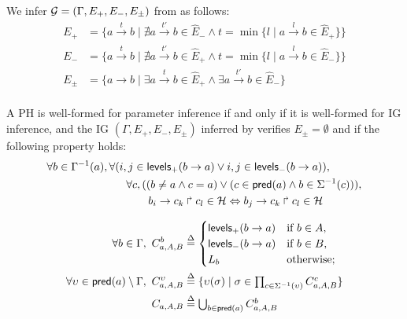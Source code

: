 \begin{proposition}\label{pps:inference-IG}
We infer $\mathcal{G} = (\Gamma,E_+,E_-,E_\pm)$ from  as follows:
\begin{align*}
E_+ &= \{a \xrightarrow{t} b \mid \nexists a \xrightarrow{t'} b \in \hat{E}_-
  \wedge t = \min \{ l \mid a \xrightarrow{l} b \in \hat{E}_+\}\} \\
E_- &= \{a \xrightarrow{t} b \mid \nexists a \xrightarrow{t'} b \in \hat{E}_+
  \wedge t = \min \{l \mid a \xrightarrow{l} b \in \hat{E}_-\}\} \\
E_\pm &= \{a \rightarrow b \mid \exists a \xrightarrow{t} b \in \hat{E}_+ \wedge \exists a \xrightarrow{t'} b \in \hat{E}_-\} \\
\end{align*}
\end{proposition}





\begin{property}\label{pro:wf-ph-K}
A PH is well-formed for parameter inference if and only if
it is well-formed for IG inference, and
the IG $(\Gamma, E_+, E_-, E_\pm)$ inferred by 
verifies $E_\pm=\emptyset$ and if the following property holds:
\begin{align}
\begin{split}
\forall b\in \Gamma^{-1}(a) &,
        \forall (i,j\in\mathsf{levels}_+(b\rightarrow a) \vee i,j\in\mathsf{levels}_-(b\rightarrow a)), \\
& \qquad        \forall c, ( (b\neq a\wedge c=a) \vee (c\in\mathsf{pred}(a) \wedge b\in\Sigma^{-1}(c))), \\
& \qquad \qquad
                        b_i\rightarrow c_k\Rsh c_l\in\mathcal{H} \Leftrightarrow
                                b_j\rightarrow c_k\Rsh c_l\in\mathcal{H}
\end{split}
\label{eq:wf-levels}
\end{align}
\end{property}

\begin{align}
\label{eq:param_context}
\forall b\in\Gamma,~
C_{a,A,B}^b & \stackrel{\Delta}= \begin{cases}
\mathsf{levels}_+(b\rightarrow a) & \text{if $b \in A$,}\\
\mathsf{levels}_-(b\rightarrow a) & \text{if $b \in B$,}\\
L_b             & \text{otherwise;}\\
\end{cases}
\\
\label{eq:param_context_coop}
\forall \upsilon \in \mathsf{pred}(a)\setminus\Gamma,~
C_{a,A,B}^\upsilon & \stackrel{\Delta}= \{
\upsilon(\sigma) \mid \sigma \in \textstyle\prod_{c\in\Sigma^{-1}(\upsilon)}C_{a,A,B}^c \}
\\
C_{a,A,B} & \stackrel{\Delta}= \textstyle\bigcup_{b\in\mathsf{pred}(a)} C^b_{a,A,B}
\label{eq:K-ctx}
\end{align}

